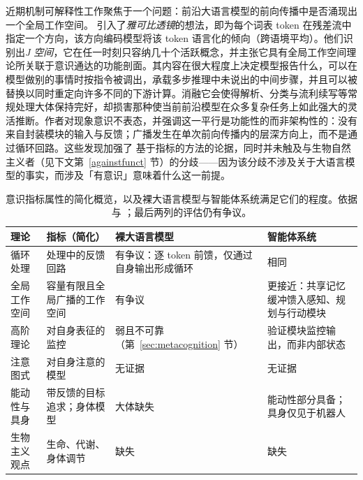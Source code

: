 近期机制可解释性工作聚焦于一个问题：前沿大语言模型的前向传播中是否涌现出一个全局工作空间。\citet{gurnee2026verbalize} 引入了\emph{雅可比透镜}的想法，即为每个词表 token 在残差流中指定一个方向，该方向编码模型将该 token 语言化的倾向（跨语境平均）。他们识别出\emph{J 空间}，它在任一时刻只容纳几十个活跃概念，并主张它具有全局工作空间理论所关联于意识通达的功能剖面。其内容在很大程度上决定模型报告什么，可以在模型做别的事情时按指令被调出，承载多步推理中未说出的中间步骤，并且可以被替换以同时重定向许多不同的下游计算。消融它会使得解析、分类与流利续写等常规处理大体保持完好，却损害那种使当前前沿模型在众多复杂任务上如此强大的灵活推断。作者对现象意识不表态，并强调这一平行是功能性的而非架构性的：没有来自封装模块的输入与反馈；广播发生在单次前向传播内的层深方向上，而不是通过循环回路。这些发现加强了 \citet{butlin2023consciousness} 基于指标的方法的论据，同时并未触及与生物自然主义者（见下文第~\ref{againstfunct} 节）的分歧——因为该分歧不涉及关于大语言模型的事实，而涉及「有意识」意味着什么这一前提。

\begin{table}
\tiny
\begin{tabularx}{\textwidth}{@{}p{2.6cm}p{3.4cm}XX@{}}
\toprule
\textbf{理论} & \textbf{指标（简化）} & \textbf{裸大语言模型} & \textbf{智能体系统} \\
\midrule
循环处理 & 处理中的反馈回路 & 有争议：逐 token 前馈，仅通过自身输出形成循环 & 相同 \\
全局工作空间 & 容量有限且全局广播的工作空间 & 有争议 & 更接近：共享记忆缓冲馈入感知、规划与行动模块 \\
高阶理论 & 对自身表征的监控 & 弱且不可靠（第~\ref{sec:metacognition} 节） & 验证模块监控输出，而非内部状态 \\
注意图式 & 对自身注意的模型 & 无证据 & 无证据 \\
能动性与具身 & 带反馈的目标追求；身体模型 & 大体缺失 & 能动性部分具备；具身仅见于机器人 \\
生物主义观点 & 生命、代谢、身体调节 & 缺失 & 缺失 \\
\bottomrule
\end{tabularx}
\caption{意识指标属性的简化概览，以及裸大语言模型与智能体系统满足它们的程度。依据 \citet{butlin2023consciousness} 与 \citet{goldstein2024case}；最后两列的评估仍有争议。}\label{tab:indicators}
\end{table}


